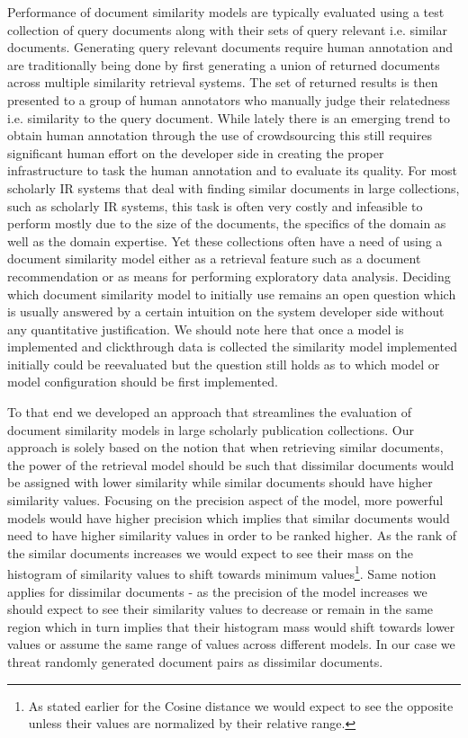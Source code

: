 \documentclass[letterpaper]{article}
\begin{document}
Performance of document similarity models are typically evaluated using a test collection of query documents along with their sets of query relevant i.e. similar documents. Generating query relevant documents require human annotation and are traditionally being done by first generating a union of returned documents across multiple similarity retrieval systems. The set of returned results is then presented to a group of human annotators who manually judge their relatedness i.e. similarity to the query document. While lately there is an emerging trend to obtain human annotation through the use of crowdsourcing this still requires significant human effort on the developer side in creating the proper infrastructure to task the human annotation and to evaluate its quality. For most scholarly IR systems that deal with finding similar documents in large collections, such as scholarly IR systems, this task is often very costly and infeasible to perform mostly due to the size of the documents, the specifics of the domain as well as the domain expertise. Yet these collections often have a need of using a document similarity model either as a retrieval feature such as a document recommendation or as means for performing exploratory data analysis. Deciding which document similarity model to initially use remains an open question which is usually answered by a certain intuition on the system developer side without any quantitative justification. We should note here that once a model is implemented and clickthrough data is collected the similarity model implemented initially could be reevaluated but the question still holds as to which model or model configuration should be first implemented. 

To that end we developed an approach that streamlines the evaluation of document similarity models in large scholarly publication collections. Our approach is solely based on the notion that when retrieving similar documents, the power of the retrieval model should be such that dissimilar documents would be assigned with lower similarity while similar documents should have higher similarity values. Focusing on the precision aspect of the model, more powerful models would have higher precision which implies that similar documents would need to have higher similarity values in order to be ranked higher. As the rank of the similar documents increases we would expect to see their mass on the histogram of similarity values to shift towards minimum values\footnote{As stated earlier for the Cosine distance we would expect to see the opposite unless their values are normalized by their relative range.}. Same notion applies for dissimilar documents - as the precision of the model increases we should expect to see their similarity values to decrease or remain in the same region which in turn implies that their histogram mass would shift towards lower values or assume the same range of values across different models. In our case we threat randomly generated document pairs as dissimilar documents. 
\end{document}
